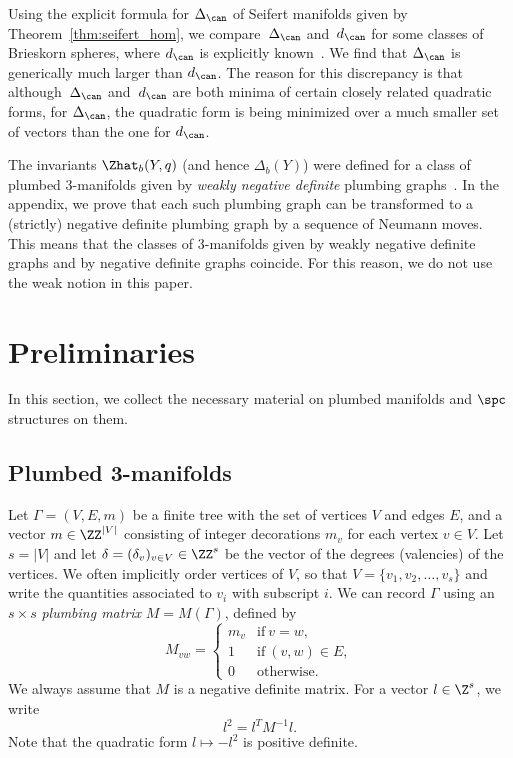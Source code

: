 \documentclass[10pt,a4paper]{amsart}
\begin{document}
Using the explicit formula for $\Delta_{\can}$ of Seifert manifolds given by Theorem~\ref{thm:seifert_hom}, we compare~$\Delta_{\can}$ and~$d_{\can}$ for some classes of Brieskorn spheres, where $d_{\can}$ is explicitly known~\cite{BorNem2011}. We find that $\Delta_{\can}$ is generically much larger than $d_{\can}$. The reason for this discrepancy is that although~$\Delta_{\can}$ and~$d_{\can}$ are both minima of certain closely related quadratic forms, for $\Delta_{\can}$, the quadratic form is being minimized over a much smaller set of vectors than the one for $d_{\can}$.

The invariants $\Zhat_b(Y,q)$ (and hence $\Delta_b(Y)$) were defined for a class of plumbed 3-manifolds given by \emph{weakly negative definite} plumbing graphs~\cite[Definition~4.3]{GM21}. In the appendix, we prove that each such plumbing graph can be transformed to a (strictly) negative definite plumbing graph by a sequence of Neumann moves. This means that the classes of 3-manifolds given by weakly negative definite graphs and by negative definite graphs coincide. For this reason, we do not use the weak notion in this paper.

\section{Preliminaries}

In this section, we collect the necessary material on plumbed manifolds and $\spc$ structures on them.

\subsection{Plumbed 3-manifolds}\label{ss:plumbing}

Let $\Gamma = (V,E,m)$ be a finite tree with the set of vertices $V$ and edges $E$, and a vector $m \in \ZZ^{\lvert V \rvert}$ consisting of integer decorations $m_v$ for each vertex $v \in V$. Let $s = \lvert V\rvert$ and let $\delta = (\delta_v)_{v \in V} \in \ZZ^s$ be the vector of the degrees (valencies) of the vertices. We often implicitly order vertices of $V$, so that $V = \{v_1,v_2,\dots,v_s\}$ and write the quantities associated to $v_i$ with subscript $i$.
We can record $\Gamma$ using an $s\times s$ \emph{plumbing matrix} $M=M(\Gamma)$, defined by
\[
 M_{vw} =
 \begin{cases}
 m_v & \text{if} \ v = w, \\
 1 & \text{if} \ (v, w) \in E, \\
 0 & \text{otherwise.}
 \end{cases}
\]
We always assume that $M$ is a negative definite matrix. For a vector $l \in \Z^s$, we write
\[
 l^2 = l^T M^{-1}l.
\]
Note that the quadratic form $l \mapsto -l^2$ is positive definite.
\end{document}
